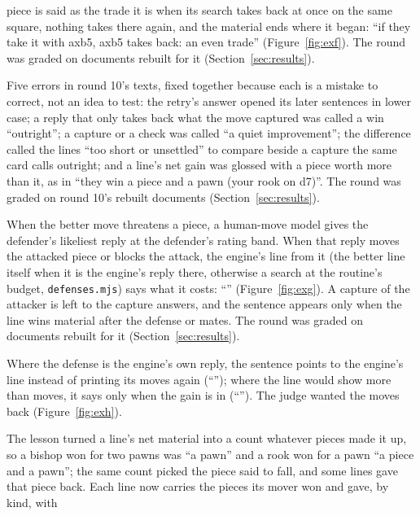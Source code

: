 \documentclass[11pt]{article}
\begin{document}
\begin{description}[style=nextline, nosep]
piece is said as the trade it is when its search takes back at once on the same square, nothing
takes there again, and the material ends where it began: ``if they take it with axb5, axb5 takes
back: an even trade'' (Figure~\ref{fig:exf}). The round was graded on documents rebuilt for it
(Section~\ref{sec:results}).
\item[Round 11: five text defects.] Five errors in round 10's texts, fixed together because each
is a mistake to correct, not an idea to test: the retry's answer opened its later sentences in
lower case; a reply that only takes back what the move captured was called a win ``outright'';
a capture or a check was called ``a quiet improvement''; the difference called the lines ``too
short or unsettled'' to compare beside a capture the same card calls outright; and a line's net
gain was glossed with a piece worth more than it, as in ``they win a piece and a pawn (your rook
on d7)''. The round was graded on round 10's rebuilt documents (Section~\ref{sec:results}).
\item[Round 12: what the natural defense costs.] When the better move threatens a piece, a
human-move model gives the defender's likeliest reply at the defender's rating band. When that
reply moves the attacked piece or blocks the attack, the engine's line from it (the better line
itself when it is the engine's reply there, otherwise a search at the routine's budget,
\texttt{defenses.mjs}) says what it costs: ``\RoundTwelveQuote'' (Figure~\ref{fig:exg}). A
capture of the attacker is left to the capture answers, and the sentence appears only when the
line wins material after the defense or mates. The round was graded on documents rebuilt for it
(Section~\ref{sec:results}).
\item[Round 13 (not kept): the defense sentence, shorter.] Where the defense is the engine's own
reply, the sentence points to the engine's line instead of printing its moves again
(``\RoundThirteenQuotePointer''); where the line would show more than \RoundThirteenCut{} moves, it
says only when the gain is in (``\RoundThirteenQuoteLong''). The judge wanted the moves back
(Figure~\ref{fig:exh}).
\item[Round 14: an amount in the pieces it is made of.] The lesson turned a line's net material
into a count whatever pieces made it up, so a bishop won for two pawns was ``a pawn'' and a rook
won for a pawn ``a piece and a pawn''; the same count picked the piece said to fall, and some
lines gave that piece back. Each line now carries the pieces its mover won and gave, by kind, with

\end{description}
\end{document}
